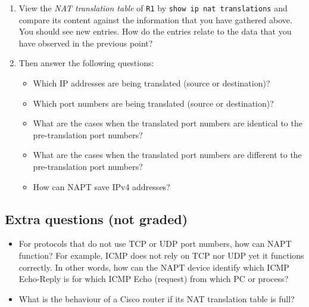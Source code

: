 \documentclass[pdftex,12pt,a4paper]{article}
\begin{document}
\begin{enumerate}
                    \item View the \emph{NAT translation table} of \texttt{R1}
                        by \texttt{show ip nat translations} and compare its
                        content against the information that you have gathered
                        above. You should see new entries. How do the entries
                        relate to the data that you have observed in the
                        previous point?

                \item Then answer the following questions:
                    \begin{itemize}
                        \item Which IP addresses are being translated (source
                            or destination)?
                        \item Which port numbers are being translated (source
                            or destination)?
                        \item What are the cases when the translated port
                            numbers are identical to the pre-translation port
                            numbers?
                        \item What are the cases when the translated port
                            numbers are different to the pre-translation port
                            numbers?
                        \item How can NAPT save IPv4 addresses?
                    \end{itemize}
                \end{enumerate}

        \subsection{Extra questions (not graded)}
            \begin{itemize}
                \item For protocols that do not use TCP or UDP port numbers,
                    how can NAPT function? For example, ICMP does not rely on
                    TCP nor UDP yet it functions correctly. In other words, how
                    can the NAPT device identify which ICMP Echo-Reply is for
                    which ICMP Echo (request) from which PC or process?
                \item What is the behaviour of a Cisco router if its NAT
                    translation table is full?
            \end{itemize}
\end{document}
